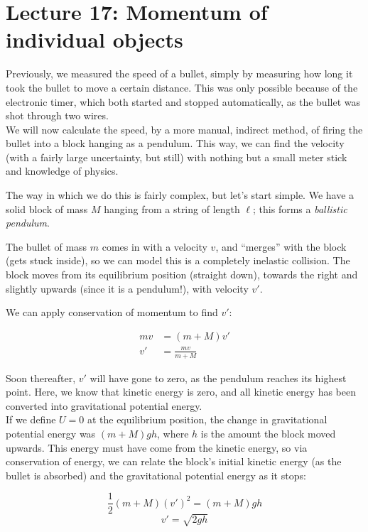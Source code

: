 \section{Lecture 17: Momentum of individual objects}

Previously, we measured the speed of a bullet, simply by measuring how long it took the bullet to move a certain distance. This was only possible because of the electronic timer, which both started and stopped automatically, as the bullet was shot through two wires.\\
We will now calculate the speed, by a more manual, indirect method, of firing the bullet into a block hanging as a pendulum. This way, we can find the velocity (with a fairly large uncertainty, but still) with nothing but a small meter stick and knowledge of physics.

The way in which we do this is fairly complex, but let's start simple. We have a solid block of mass $M$ hanging from a string of length $\ell$; this forms a \emph{ballistic pendulum}.

The bullet of mass $m$ comes in with a velocity $v$, and ``merges'' with the block (gets stuck inside), so we can model this is a completely inelastic collision. The block moves from its equilibrium position (straight down), towards the right and slightly upwards (since it is a pendulum!), with velocity $v'$.

We can apply conservation of momentum to find $v'$:

\begin{align}
m v &= (m + M) v'\\
v' &= \frac	{m v}{m + M}
\end{align}

Soon thereafter, $v'$ will have gone to zero, as the pendulum reaches its highest point. Here, we know that kinetic energy is zero, and all kinetic energy has been converted into gravitational potential energy.\\
If we define $U = 0$ at the equilibrium position, the change in gravitational potential energy was $(m + M) g h$, where $h$ is the amount the block moved upwards. This energy must have come from the kinetic energy, so via conservation of energy, we can relate the block's initial kinetic energy (as the bullet is absorbed) and the gravitational potential energy as it stops:

\begin{equation}
\frac{1}{2} (m + M) (v')^2 = (m + M) g h
\end{equation}
\begin{equation}
v' = \sqrt{2 g h}
\end{equation}

